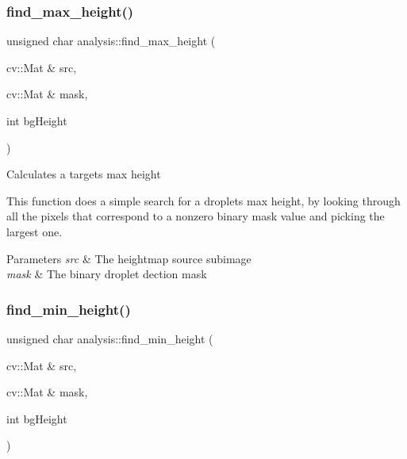 \mbox{\label{namespaceanalysis_a3f5d294c05ef3a60c6c625a14462ee57}} 
\subsubsection{\texorpdfstring{find\+\_\+max\+\_\+height()}{find\_max\_height()}}
{\footnotesize\ttfamily unsigned char analysis\+::find\+\_\+max\+\_\+height (\begin{DoxyParamCaption}\item[{cv\+::\+Mat \&}]{src,  }\item[{cv\+::\+Mat \&}]{mask,  }\item[{int}]{bg\+Height }\end{DoxyParamCaption})}

Calculates a target\textquotesingle{}s max height

This function does a simple search for a droplet\textquotesingle{}s max height, by looking through all the pixels that correspond to a nonzero binary mask value and picking the largest one.


\begin{DoxyParams}{Parameters}
{\em src} & The heightmap source subimage \\
\hline
{\em mask} & The binary droplet dection mask \\
\hline
\end{DoxyParams}
\mbox{\label{namespaceanalysis_a2b1a5cd712bd7a8d9bb92ca72f4af6e9}} 
\subsubsection{\texorpdfstring{find\+\_\+min\+\_\+height()}{find\_min\_height()}}
{\footnotesize\ttfamily unsigned char analysis\+::find\+\_\+min\+\_\+height (\begin{DoxyParamCaption}\item[{cv\+::\+Mat \&}]{src,  }\item[{cv\+::\+Mat \&}]{mask,  }\item[{int}]{bg\+Height }\end{DoxyParamCaption})}

